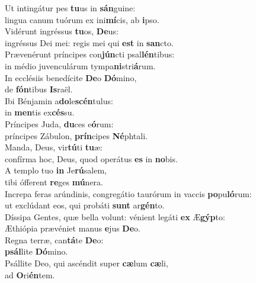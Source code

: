 \oddverse Ut intingátur pes \textbf{tu}us in \textbf{sán}guine:~\*\\
\oddverse lingua canum tuórum ex ini\textbf{mí}cis, ab \textbf{i}pso.\\
\evenverse Vidérunt ingréssus \textbf{tu}os, \textbf{De}us:~\*\\
\evenverse ingréssus Dei mei: regis mei qui \textbf{est} in \textbf{san}cto.\\
\oddverse Prævenérunt príncipes con\textbf{jún}cti psal\textbf{lén}tibus:~\*\\
\oddverse in médio juvenculárum tympa\textbf{ni}stri\textbf{á}rum.\\
\evenverse In ecclésiis benedícite \textbf{De}o \textbf{Dó}mino,~\*\\
\evenverse de \textbf{fón}tibus \textbf{Is}raël.\\
\oddverse Ibi Bénjamin a\textbf{do}le\textbf{scén}tulus:~\*\\
\oddverse in \textbf{men}tis ex\textbf{cés}su.\\
\evenverse Príncipes Juda, \textbf{du}ces e\textbf{ó}rum:~\*\\
\evenverse príncipes Zábulon, \textbf{prín}cipes \textbf{Né}phtali.\\
\oddverse Manda, Deus, vir\textbf{tú}ti \textbf{tu}æ:~\*\\
\oddverse confírma hoc, Deus, quod operátus \textbf{es} in \textbf{no}bis.\\
\evenverse A templo tuo \textbf{in} Je\textbf{rú}salem,~\*\\
\evenverse tibi ófferent \textbf{re}ges \textbf{mú}nera.\\
\oddverse Increpa feras arúndinis, congregátio taurórum in vaccis \textbf{po}pu\textbf{ló}rum:~\*\\
\oddverse ut exclúdant eos, qui probáti \textbf{sunt} ar\textbf{gén}to.\\
\evenverse Díssipa Gentes, quæ bella volunt: vénient legáti \textbf{ex} Æ\textbf{gýp}to:~\*\\
\evenverse Æthiópia prævéniet manus \textbf{e}jus \textbf{De}o.\\
\oddverse Regna terræ, can\textbf{tá}te \textbf{De}o:~\*\\
\oddverse \textbf{psál}lite \textbf{Dó}mino.\\
\evenverse Psállite Deo, qui ascéndit super \textbf{cæ}lum \textbf{cæ}li,~\*\\
\evenverse ad \textbf{O}ri\textbf{én}tem.\\
